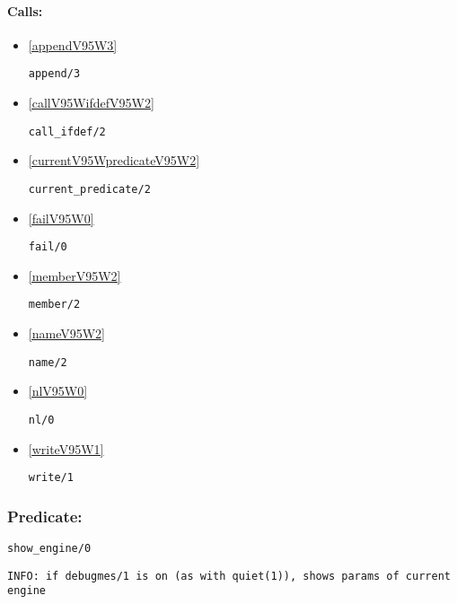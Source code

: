 \paragraph{Calls:} 
\begin{itemize}
\item \ref{appendV95W3} 
\begin{verbatim}
append/3
\end{verbatim}

\item \ref{callV95WifdefV95W2} 
\begin{verbatim}
call_ifdef/2
\end{verbatim}

\item \ref{currentV95WpredicateV95W2} 
\begin{verbatim}
current_predicate/2
\end{verbatim}

\item \ref{failV95W0} 
\begin{verbatim}
fail/0
\end{verbatim}

\item \ref{memberV95W2} 
\begin{verbatim}
member/2
\end{verbatim}

\item \ref{nameV95W2} 
\begin{verbatim}
name/2
\end{verbatim}

\item \ref{nlV95W0} 
\begin{verbatim}
nl/0
\end{verbatim}

\item \ref{writeV95W1} 
\begin{verbatim}
write/1
\end{verbatim}

\end{itemize}

\subsubsection{Predicate:} \label{showV95WengineV95W0}

\begin{verbatim}
show_engine/0
\end{verbatim}

{\small \begin{verbatim}
INFO: if debugmes/1 is on (as with quiet(1)), shows params of current engine

\end{verbatim}}


